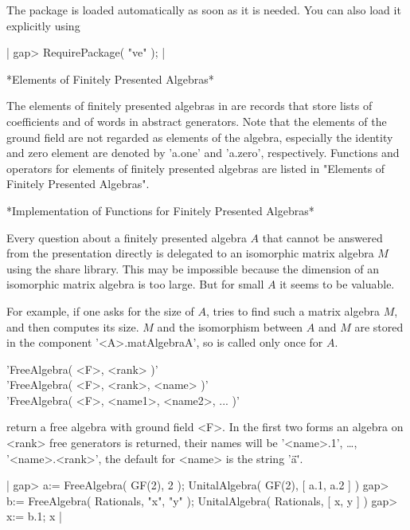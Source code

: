 The {\VE} package is loaded automatically as soon as it is needed.
You can also load it explicitly using

|    gap> RequirePackage( "ve" ); |

\vspace{3mm}

*Elements of Finitely Presented Algebras*

The elements of finitely presented algebras in {\GAP} are records that
store lists of coefficients and of words in abstract generators.
Note that the elements of the ground field are not regarded as elements
of the algebra, especially the identity and zero element are denoted by
'a.one' and 'a.zero', respectively.
Functions and operators for elements of finitely presented algebras are
listed in "Elements of Finitely Presented Algebras".

\vspace{3mm}

*Implementation of Functions for Finitely Presented Algebras*

Every question about a finitely presented algebra $A$ that cannot be answered
from the presentation directly is delegated to an isomorphic matrix algebra
$M$ using the {\VE} share library.  This may be impossible because the
dimension of an isomorphic matrix algebra is too large.  But for small $A$
it seems to be valuable.

For example, if one asks for the size of $A$, {\VE} tries to find such a
matrix algebra $M$, and then {\GAP} computes its size.
$M$ and the isomorphism between $A$ and $M$ are stored in the component
'<A>.matAlgebraA', so {\VE} is called only once for $A$.


'FreeAlgebra( <F>, <rank> )'\\
'FreeAlgebra( <F>, <rank>, <name> )'\\
'FreeAlgebra( <F>, <name1>, <name2>, ... )'

return a free algebra with ground field <F>.  In the first two forms an
algebra on <rank> free generators is returned, their names will be
'<name>.1', \ldots, '<name>.<rank>', the default for <name> is the string
'\"a\"'.

|    gap> a:= FreeAlgebra( GF(2), 2 );
    UnitalAlgebra( GF(2), [ a.1, a.2 ] )
    gap> b:= FreeAlgebra( Rationals, "x", "y" );
    UnitalAlgebra( Rationals, [ x, y ] )
    gap> x:= b.1;
    x |

